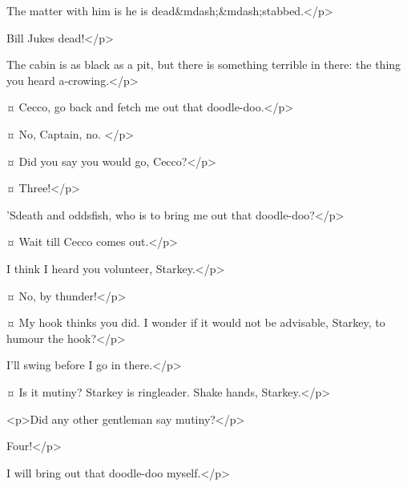 \begin{drama}
\ceccospeaks
The matter with him is he is dead&mdash;&mdash;stabbed.</p>

Bill Jukes dead!</p>

\ceccospeaks
The cabin is as black as a pit, but there is something terrible in there:
the thing you heard a-crowing.</p>

\hookspeaks {}¤
Cecco, go back and fetch me out that doodle-doo.</p>

\ceccospeaks {}¤
No, Captain, no.
</p>

\hookspeaks {}¤
Did you say you would go, Cecco?</p>


\slightlyspeaks {}¤
Three!</p>

\hookspeaks
'Sdeath and oddsfish, who is to bring me out that doodle-doo?</p>


\starkeyspeaks {}¤
Wait till Cecco comes out.</p>


\hookspeaks
I think I heard you volunteer, Starkey.</p>

\starkeyspeaks {}¤
No, by thunder!</p>

\hookspeaks {}¤
My hook thinks you did.
I wonder if it would not be advisable, Starkey, to humour the hook?</p>

\starkeyspeaks
I'll swing before I go in there.</p>

\hookspeaks {}¤
Is it mutiny?
Starkey is ringleader.
Shake hands, Starkey.</p>


<p>Did any other gentleman say mutiny?</p>


\slightlyspeaks
Four!</p>

\hookspeaks
I will bring out that doodle-doo myself.</p>



\end{drama}
